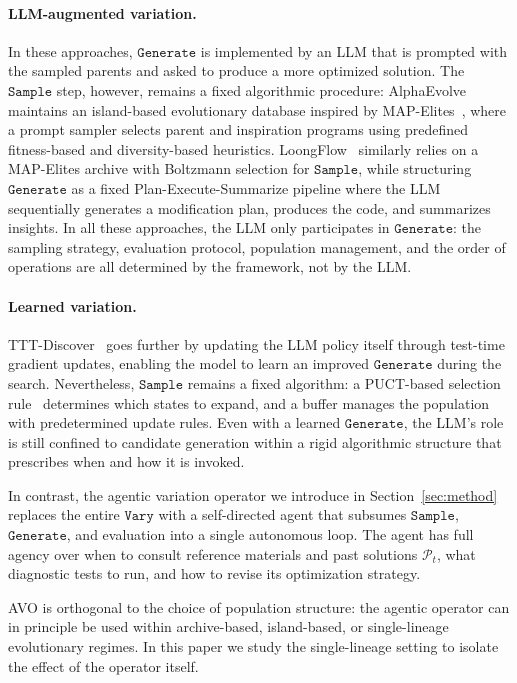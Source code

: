 \paragraph{LLM-augmented variation.}
In these approaches, $\texttt{Generate}$ is implemented by an LLM that is prompted with the sampled parents and asked to produce a more optimized solution.
The $\texttt{Sample}$ step, however, remains a fixed algorithmic procedure: AlphaEvolve maintains an island-based evolutionary database inspired by MAP-Elites~\citep{mouret2015mapelites}, where a prompt sampler selects parent and inspiration programs using predefined fitness-based and diversity-based heuristics.
LoongFlow~\citep{wan2025loongflow} similarly relies on a MAP-Elites archive with Boltzmann selection for $\texttt{Sample}$, while structuring $\texttt{Generate}$ as a fixed Plan-Execute-Summarize pipeline where the LLM sequentially generates a modification plan, produces the code, and summarizes insights.
In all these approaches, the LLM only participates in $\texttt{Generate}$: the sampling strategy, evaluation protocol, population management, and the order of operations are all determined by the framework, not by the LLM.

\paragraph{Learned variation.}
TTT-Discover~\citep{yuksekgonul2025tttdiscover} goes further by updating the LLM policy itself through test-time gradient updates, enabling the model to learn an improved $\texttt{Generate}$ during the search.
Nevertheless, $\texttt{Sample}$ remains a fixed algorithm: a PUCT-based selection rule~\citep{silver2016alphago} determines which states to expand, and a buffer manages the population with predetermined update rules.
Even with a learned $\texttt{Generate}$, the LLM's role is still confined to candidate generation within a rigid algorithmic structure that prescribes when and how it is invoked.

In contrast, the agentic variation operator we introduce in Section~\ref{sec:method} replaces the entire $\texttt{Vary}$ with a self-directed agent that subsumes $\texttt{Sample}$, $\texttt{Generate}$, and evaluation into a single autonomous loop.
The agent has full agency over when to consult reference materials and past solutions $\mathcal{P}_t$, what diagnostic tests to run, and how to revise its optimization strategy.

AVO is orthogonal to the choice of population structure: the agentic operator can in principle be used within archive-based, island-based, or single-lineage evolutionary regimes.
In this paper we study the single-lineage setting to isolate the effect of the operator itself.

